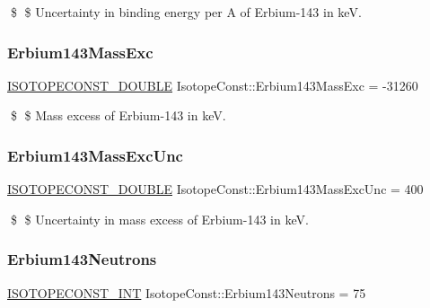 \$ \$ Uncertainty in binding energy per A of Erbium-\/143 in keV. \mbox{\label{group___isotope_const-_erbium-_er143_ga1b634b0a46b8b4722d2a2af606a566b3}} 
\subsubsection{\texorpdfstring{Erbium143\+Mass\+Exc}{Erbium143MassExc}}
{\footnotesize\ttfamily \mbox{\hyperlink{group___isotope_const-_macros_ga8f45a7272ce02c0b4c65c44636ed719a}{I\+S\+O\+T\+O\+P\+E\+C\+O\+N\+S\+T\+\_\+\+D\+O\+U\+B\+LE}} Isotope\+Const\+::\+Erbium143\+Mass\+Exc = -\/31260}

\$ \$ Mass excess of Erbium-\/143 in keV. \mbox{\label{group___isotope_const-_erbium-_er143_ga1aa28ebec5ebc9f93c83a8717523c8b1}} 
\subsubsection{\texorpdfstring{Erbium143\+Mass\+Exc\+Unc}{Erbium143MassExcUnc}}
{\footnotesize\ttfamily \mbox{\hyperlink{group___isotope_const-_macros_ga8f45a7272ce02c0b4c65c44636ed719a}{I\+S\+O\+T\+O\+P\+E\+C\+O\+N\+S\+T\+\_\+\+D\+O\+U\+B\+LE}} Isotope\+Const\+::\+Erbium143\+Mass\+Exc\+Unc = 400}

\$ \$ Uncertainty in mass excess of Erbium-\/143 in keV. \mbox{\label{group___isotope_const-_erbium-_er143_ga121621c20c222a4c5c81b8ebf7292e2f}} 
\subsubsection{\texorpdfstring{Erbium143\+Neutrons}{Erbium143Neutrons}}
{\footnotesize\ttfamily \mbox{\hyperlink{group___isotope_const-_macros_ga5f18360b3e99483a35c32d789e62621c}{I\+S\+O\+T\+O\+P\+E\+C\+O\+N\+S\+T\+\_\+\+I\+NT}} Isotope\+Const\+::\+Erbium143\+Neutrons = 75}

